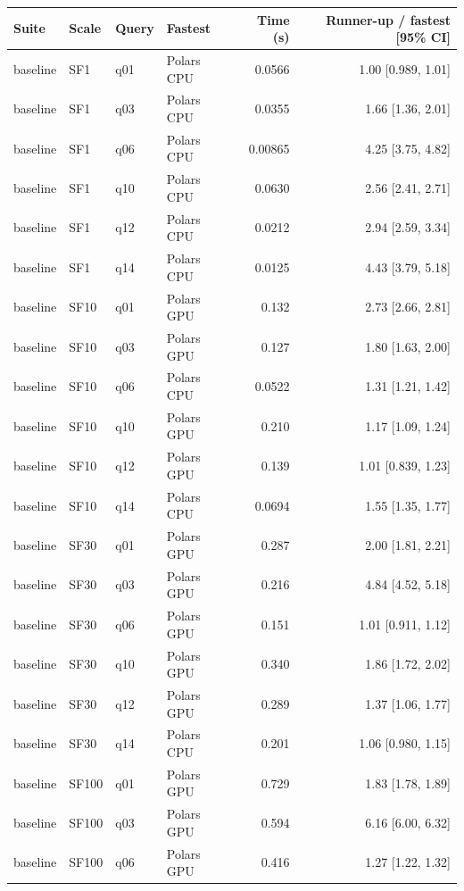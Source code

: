 \begin{longtable}{llllrr}
\toprule
Suite & Scale & Query & Fastest & Time (s) & Runner-up / fastest [95\% CI] \\
\midrule
\endhead
\bottomrule
\endfoot
baseline & SF1 & q01 & Polars CPU & 0.0566 & 1.00 [0.989, 1.01] \\
baseline & SF1 & q03 & Polars CPU & 0.0355 & 1.66 [1.36, 2.01] \\
baseline & SF1 & q06 & Polars CPU & 0.00865 & 4.25 [3.75, 4.82] \\
baseline & SF1 & q10 & Polars CPU & 0.0630 & 2.56 [2.41, 2.71] \\
baseline & SF1 & q12 & Polars CPU & 0.0212 & 2.94 [2.59, 3.34] \\
baseline & SF1 & q14 & Polars CPU & 0.0125 & 4.43 [3.79, 5.18] \\
baseline & SF10 & q01 & Polars GPU & 0.132 & 2.73 [2.66, 2.81] \\
baseline & SF10 & q03 & Polars GPU & 0.127 & 1.80 [1.63, 2.00] \\
baseline & SF10 & q06 & Polars CPU & 0.0522 & 1.31 [1.21, 1.42] \\
baseline & SF10 & q10 & Polars GPU & 0.210 & 1.17 [1.09, 1.24] \\
baseline & SF10 & q12 & Polars GPU & 0.139 & 1.01 [0.839, 1.23] \\
baseline & SF10 & q14 & Polars CPU & 0.0694 & 1.55 [1.35, 1.77] \\
baseline & SF30 & q01 & Polars GPU & 0.287 & 2.00 [1.81, 2.21] \\
baseline & SF30 & q03 & Polars GPU & 0.216 & 4.84 [4.52, 5.18] \\
baseline & SF30 & q06 & Polars GPU & 0.151 & 1.01 [0.911, 1.12] \\
baseline & SF30 & q10 & Polars GPU & 0.340 & 1.86 [1.72, 2.02] \\
baseline & SF30 & q12 & Polars GPU & 0.289 & 1.37 [1.06, 1.77] \\
baseline & SF30 & q14 & Polars CPU & 0.201 & 1.06 [0.980, 1.15] \\
baseline & SF100 & q01 & Polars GPU & 0.729 & 1.83 [1.78, 1.89] \\
baseline & SF100 & q03 & Polars GPU & 0.594 & 6.16 [6.00, 6.32] \\
baseline & SF100 & q06 & Polars GPU & 0.416 & 1.27 [1.22, 1.32] \\

\end{longtable}
